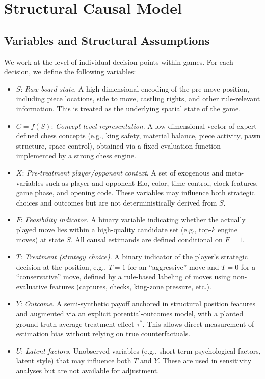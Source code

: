 \documentclass{article}
\begin{document}
\section{Structural Causal Model}

\subsection{Variables and Structural Assumptions}

We work at the level of individual decision points within games. For each decision,
we define the following variables:

\begin{itemize}
\item \(S\): \emph{Raw board state}. A high-dimensional encoding of the pre-move
position, including piece locations, side to move, castling rights, and other
rule-relevant information. This is treated as the underlying spatial state of the
game.
\item \(C = f(S)\): \emph{Concept-level representation}. A low-dimensional vector
of expert-defined chess concepts (e.g., king safety, material balance, piece
activity, pawn structure, space control), obtained via a fixed evaluation function
implemented by a strong chess engine.\cite{lemeire2005causalmodelsinchess,stockfish}
\item \(X\): \emph{Pre-treatment player/opponent context}. A set of exogenous and
meta-variables such as player and opponent Elo, color, time control, clock features,
game phase, and opening code. These variables may influence both strategic choices
and outcomes but are not deterministically derived from \(S\).
\item \(F\): \emph{Feasibility indicator}. A binary variable indicating whether the
actually played move lies within a high-quality candidate set (e.g., top-\(k\)
engine moves) at state \(S\). All causal estimands are defined conditional on
\(F=1\).
\item \(T\): \emph{Treatment (strategy choice)}. A binary indicator of the player's
strategic decision at the position, e.g., \(T=1\) for an ``aggressive'' move and
\(T=0\) for a ``conservative'' move, defined by a rule-based labeling of moves
using non-evaluative features (captures, checks, king-zone pressure, etc.).
\item \(Y\): \emph{Outcome}. A semi-synthetic payoff anchored in structural position
features and augmented via an explicit potential-outcomes model, with a planted
ground-truth average treatment effect $\tau^*$. This allows direct measurement of
estimation bias without relying on true counterfactuals.
\item \(U\): \emph{Latent factors}. Unobserved variables (e.g., short-term
psychological factors, latent style) that may influence both \(T\) and \(Y\). These
are used in sensitivity analyses but are not available for adjustment.
\end{itemize}
\end{document}
